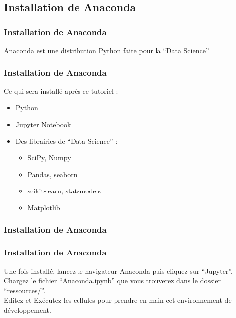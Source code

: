 \subsection{Installation de Anaconda}

\begin{frame}
  \frametitle{Installation de Anaconda}
  Anaconda est une distribution Python faite pour la ``Data Science'' \\
\end{frame}

\begin{frame}
  \frametitle{Installation de Anaconda}
  Ce qui sera installé après ce tutoriel :
  \begin{itemize}
  \item Python
  \item Jupyter Notebook
  \item Des librairies de ``Data Science'' :
    \begin{itemize}
    \item SciPy, Numpy
    \item Pandas, seaborn
    \item scikit-learn, statsmodels
    \item Matplotlib
    \end{itemize}
  \end{itemize}
\end{frame}

\begin{frame}
  \frametitle{Installation de Anaconda}
\end{frame}

\begin{frame}
  \frametitle{Installation de Anaconda}
  Une fois installé, lancez le navigateur Anaconda puis cliquez sur ``Jupyter''. \\
  Chargez le fichier ``Anaconda.ipynb'' que vous trouverez dans le dossier ``ressources/''. \\
  Editez et Exécutez les cellules pour prendre en main cet environnement de développement.
\end{frame}

